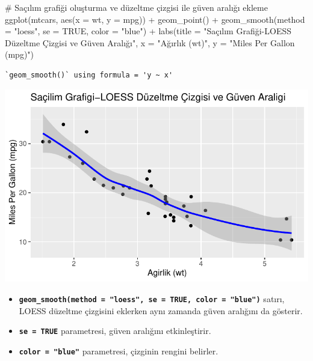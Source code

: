 \documentclass[
  letterpaper,
  DIV=11,
  numbers=noendperiod]{scrreprt}
\newenvironment{Shaded}{\begin{snugshade}}{\end{snugshade}}
\newcommand{\AttributeTok}[1]{\textcolor[rgb]{0.40,0.45,0.13}{#1}}
\newcommand{\CommentTok}[1]{\textcolor[rgb]{0.37,0.37,0.37}{#1}}
\newcommand{\ConstantTok}[1]{\textcolor[rgb]{0.56,0.35,0.01}{#1}}
\newcommand{\FunctionTok}[1]{\textcolor[rgb]{0.28,0.35,0.67}{#1}}
\newcommand{\NormalTok}[1]{\textcolor[rgb]{0.00,0.23,0.31}{#1}}
\newcommand{\SpecialCharTok}[1]{\textcolor[rgb]{0.37,0.37,0.37}{#1}}
\newcommand{\StringTok}[1]{\textcolor[rgb]{0.13,0.47,0.30}{#1}}
\begin{document}
\begin{Shaded}
\begin{Highlighting}[]
\CommentTok{\# Saçılım grafiği oluşturma ve düzeltme çizgisi ile güven aralığı ekleme}
\FunctionTok{ggplot}\NormalTok{(mtcars, }\FunctionTok{aes}\NormalTok{(}\AttributeTok{x =}\NormalTok{ wt, }\AttributeTok{y =}\NormalTok{ mpg)) }\SpecialCharTok{+}
  \FunctionTok{geom\_point}\NormalTok{() }\SpecialCharTok{+}
  \FunctionTok{geom\_smooth}\NormalTok{(}\AttributeTok{method =} \StringTok{"loess"}\NormalTok{, }\AttributeTok{se =} \ConstantTok{TRUE}\NormalTok{, }\AttributeTok{color =} \StringTok{"blue"}\NormalTok{) }\SpecialCharTok{+}
  \FunctionTok{labs}\NormalTok{(}\AttributeTok{title =} \StringTok{"Saçılım Grafiği{-}LOESS Düzeltme Çizgisi ve Güven Aralığı"}\NormalTok{,}
       \AttributeTok{x =} \StringTok{"Ağırlık (wt)"}\NormalTok{,}
       \AttributeTok{y =} \StringTok{"Miles Per Gallon (mpg)"}\NormalTok{)}
\end{Highlighting}
\end{Shaded}

\begin{verbatim}
`geom_smooth()` using formula = 'y ~ x'
\end{verbatim}

\includegraphics{ggplot2_files/figure-pdf/unnamed-chunk-13-1.pdf}

\begin{itemize}
\item
  \textbf{\texttt{geom\_smooth(method\ =\ "loess",\ se\ =\ TRUE,\ color\ =\ "blue")}}
  satırı, LOESS düzeltme çizgisini eklerken aynı zamanda güven aralığını
  da gösterir.
\item
  \textbf{\texttt{se\ =\ TRUE}} parametresi, güven aralığını
  etkinleştirir.
\item
  \textbf{\texttt{color\ =\ "blue"}} parametresi, çizginin rengini
  belirler.
\end{itemize}
\end{document}
